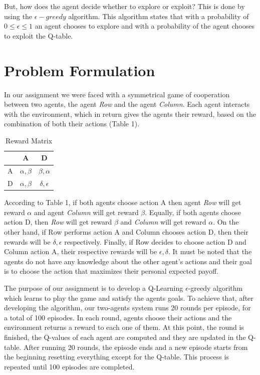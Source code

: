 \documentclass[10pt,a4paper,twocolumn]{article}
\begin{document}
	But, how does the agent decide whether to explore or exploit? This is done by using the $\epsilon - greedy$ algorithm. This algorithm states that with a probability of $0 \le \epsilon \le 1 $  an agent chooses to explore and with a probability of  the agent chooses to exploit the Q-table.


	\section{Problem Formulation}
	
	In our assignment we were faced with a symmetrical game of cooperation between two agents, the agent \textit{Row} and the agent \textit{Column}. Each agent interacts with the environment, which in return gives the agents their reward, based on the combination of both their actions (Table 1).
	


\begin{table}[h!]
	\centering
	\begin{tabular}{|c c c|} 
		\hline
		 & A & D  \\ [0.5ex] 
		\hline\hline
		A & $\alpha,\beta$  & $\beta,\alpha$  \\
		D & $\alpha,\beta$ & $\delta,\epsilon$  \\ [1ex] 
		\hline
	\end{tabular}
		\caption{Reward Matrix \label{overflow}}
	\end{table}

	According to Table 1, if both agents choose action A then agent \textit{Row} will get reward $\alpha$ and agent \textit{Column} will get reward $\beta$. Equally, if both agents choose action D, then \textit{Row} will get reward $\beta$ and \textit{Column} will get reward $\alpha$. On the other hand, if Row performs action A and Column chooses action D, then their rewards will be $\delta, \epsilon$ respectively. Finally, if Row decides to choose action D and Column action A, their respective rewards will be $\epsilon, \delta$. It must be noted that the agents do not have any knowledge about the other agent’s actions and their goal is to choose the action that maximizes their personal expected payoff.

	The purpose of our assignment is to develop a Q-Learning $\epsilon$-greedy algorithm which learns to play the game and satisfy the agents goals. To achieve that, after developing the algorithm, our two-agents system runs 20 rounds per episode, for a total of 100 episodes. In each round, agents choose their actions and the environment returns a reward to each one of them. At this point, the round is finished, the Q-values of each agent are computed and they are updated in the Q-table. After running 20 rounds, the episode ends and a new episode starts from the beginning resetting everything except for the Q-table. This process is repeated until 100 episodes are completed.
	
\end{document}
